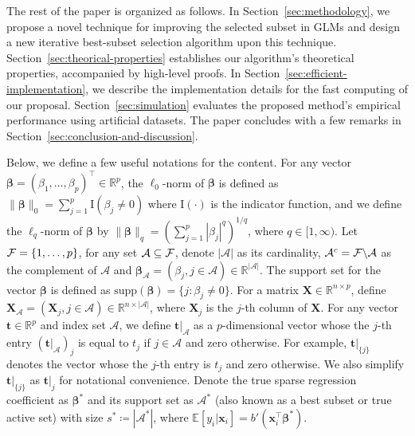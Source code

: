 The rest of the paper is organized as follows. In Section~\ref{sec:methodology}, we propose a novel technique for improving the selected subset in GLMs and design a new iterative best-subset selection algorithm upon this technique. Section~\ref{sec:theorical-properties} establishes our algorithm's theoretical properties, accompanied by high-level proofs. In Section~\ref{sec:efficient-implementation}, we describe the implementation details for the fast computing of our proposal. Section~\ref{sec:simulation} evaluates the proposed method's empirical performance using artificial datasets.
\else{
}\fi
The paper concludes with a few remarks in Section~\ref{sec:conclusion-and-discussion}.
\fi

Below, we define a few useful notations for the content.
For any vector $\boldsymbol \beta = (\beta_1,\ldots,\beta_p)^\top \in \mathbb{R}^p$,
the $\ell_0$-norm of $\boldsymbol \beta$ is defined as $\|\boldsymbol\beta\|_0 = \sum\limits_{j=1}^p \mathrm{I} (\beta_j \neq 0)$ where $\mathrm{I}(\cdot)$ is the indicator function,
and we define the $\ell_q$-norm of $\boldsymbol \beta$ by $\|\boldsymbol\beta\|_q = ( \sum\limits_{j=1}^p |\beta_j|^q)^{1/q}$, where $q\in[1,\infty)$.
Let $\mathcal{F} = \{1, \ldots, p\}$, for any set $\mathcal{A}\subseteq \mathcal{F}$,
denote $|\mathcal{A}|$ as its cardinality, $\mathcal{A}^c= \mathcal{F}\backslash \mathcal{A}$ as the complement of $\mathcal{A}$ and $\boldsymbol\beta_{\mathcal{A}} =(\beta_j, j\in \mathcal{A}) \in \mathbb{R}^{|\mathcal{A}|}$.
The support set for the vector $\boldsymbol\beta$ is defined as $\mathrm{supp}(\boldsymbol\beta) = \{ j : \beta_j\neq 0\}$.
For a matrix $\mathbf{X} \in \mathbb{R}^{n\times p}$,
define $\mathbf{X}_{\mathcal{A}} = (\mathbf{X}_j, j\in \mathcal{A})\in \mathbb{R}^{n\times |\mathcal{A}|}$,
where $\mathbf{X}_j$ is the $j$-th column of $\mathbf{X}$.
For any vector $\boldsymbol t \in \mathbb{R}^p$ and index set $\mathcal{A}$,
we define $\boldsymbol t|_{\mathcal{A}}$ as a $p$-dimensional vector
whose the $j$-th entry $(\boldsymbol t|_{\mathcal{A}})_j$ is equal to $t_j$ if $j\in \mathcal{A}$ and zero otherwise.
For example,
$\boldsymbol t|_{\{j\}}$ denotes the vector whose the $j$-th entry is $t_j$ and zero otherwise.
We also simplify $\boldsymbol t|_{\{j\}}$ as $\boldsymbol t|_{j}$ for notational convenience. Denote the true sparse regression coefficient as $\boldsymbol{\beta}^*$ and its support set as $\mathcal{A}^*$ (also known as a best subset or true active set) with size $s^* \coloneqq |\mathcal{A}^*|$, where $\mathbb{E}[y_i|\boldsymbol {x}_i] = b'(\boldsymbol{x}_i^\top \boldsymbol{\beta}^*)$.